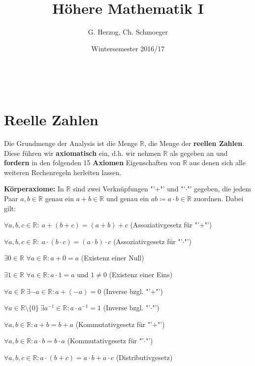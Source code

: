 \documentclass[12pt]{extreport} %
\title{Höhere Mathematik I}
\author{G. Herzog, Ch. Schmoeger}
\date{Wintersemester 2016/17}
\makeatletter
\newcommand{\R}{\mathbb{R}}
\theoremstyle{named}
\theoremstyle{itshape}
\theoremstyle{normal}
\def\maketitle{ \begin{titlepage} 
			~\vspace{3cm} 
		\begin{center} {\Huge \@title} \end{center} 
	 		\vspace*{1cm} 
	 	\begin{center} {\large \@author} \end{center} 
	 	\begin{center} \@date \end{center} 
	 		\vspace*{7cm} 
	 	\begin{center} \@publishers \end{center} 
	 		\vfill 
	\end{titlepage} }
\makeatother
\begin{document}
\begin{titlepage}
	\maketitle
	\thispagestyle{empty}
\end{titlepage}
	
\tableofcontents
\thispagestyle{empty}
  
\chapter{Reelle Zahlen}

Die Grundmenge der Analysis ist die Menge $\R$, die Menge der \textbf{reellen Zahlen}. Diese führen wir \textbf{axiomatisch} ein, d.h. wir nehmen $\R$ als gegeben an und 
\textbf{fordern} in den folgenden 15 \textbf{Axiomen} Eigenschaften von $\R$ aus denen sich alle weiteren Rechenregeln herleiten lassen.  

\bigskip
\bigskip

\textbf{Körperaxiome:} In $\R$ sind zwei Verknüpfungen "'$+$"' und "'$\cdot$"' gegeben, die jedem Paar $a, b \in \R$ genau ein $a + b \in \R$ und genau ein 
$a b \coloneqq a \cdot b \in \R$ zuordnen. Dabei gilt:
\begin{description} \addtolength{\itemindent}{0.4cm} \label{k.axiom}
	\item[$(A1)$] $\forall a, b, c \in \R: \: a + \left( b + c \right) = \left( a + b \right) + c$  (Assoziativgesetz für "'$+$"') \label{k.axiom-a1}
	\item[$(A5)$] $\forall a, b, c \in \R: \: a \cdot \left( b \cdot c \right) = \left( a \cdot b \right) \cdot c$ (Assoziativgesetz für "'$\cdot$"') \label{k.axiom-a5}
	\item[$(A2)$] $\exists 0 \in \R$ $\forall a \in \R : a + 0 = a$ (Existenz einer Null) \label{k.axiom-a2}
	\item[$(A6)$] $\exists 1 \in \R$ $\forall a \in \R : a \cdot 1 = a$ und $1 \neq 0$ (Existenz einer Eins) \label{k.axiom-a6}
	\item[$(A3)$] $\forall a \in \R ~ \exists -a \in \R : a + (-a) = 0$ (Inverse bzgl. "'$+$"')  \label{k.axiom-a3} 
	\item[$(A7)$] $\forall a \in \R \setminus \{ 0 \} ~ \exists a^{-1} \in \R : a \cdot a^{-1} = 1$ (Inverse bzgl. "'$\cdot$"')  \label{k.axiom-a7}
	\item[$(A4)$] $\forall a, b \in \R : a + b = b + a$ (Kommutativgesetz für "'$+$"') \label{k.axiom-a4}
	\item[$(A8)$] $\forall a, b \in \R : a \cdot b = b \cdot a$ (Kommutativgesetz für "'$\cdot$"') \label{k.axiom-a8}
	\item[$(A9)$] $\forall a, b, c \in \R : a \cdot (b + c) = a \cdot b + a \cdot c$ (Distributivgesetz) \label{k.axiom-a9}
\end{description}
\end{document}
